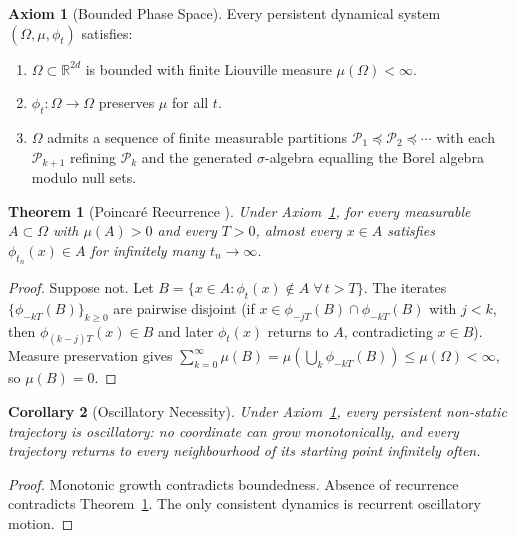 \documentclass[twocolumn,10pt,a4paper]{article}
\theoremstyle{thmstyle}
\newtheorem{theorem}{Theorem}[section]
\newtheorem{corollary}[theorem]{Corollary}
\theoremstyle{definition}
\newtheorem{axiom}{Axiom}
\theoremstyle{remark}
\newcommand{\R}{\mathbb{R}}
\begin{document}
\begin{axiom}[Bounded Phase Space]
\label{ax:bounded}
Every persistent dynamical system $(\Omega, \mu, \phi_t)$ satisfies:
\begin{enumerate}[nosep,label=(\roman*)]
\item $\Omega \subset \R^{2d}$ is bounded with finite Liouville measure
$\mu(\Omega) < \infty$.
\item $\phi_t : \Omega \to \Omega$ preserves $\mu$ for all $t$.
\item $\Omega$ admits a sequence of finite measurable partitions
$\mathcal{P}_1 \preceq \mathcal{P}_2 \preceq \cdots$ with each $\mathcal{P}_{k+1}$
refining $\mathcal{P}_k$ and the generated $\sigma$-algebra equalling the
Borel algebra modulo null sets.
\end{enumerate}
\end{axiom}

\begin{theorem}[Poincar\'e Recurrence \citealp{poincare1890}]
\label{thm:poincare}
Under Axiom~\ref{ax:bounded}, for every measurable $A \subset \Omega$ with
$\mu(A) > 0$ and every $T > 0$, almost every $x \in A$ satisfies
$\phi_{t_n}(x) \in A$ for infinitely many $t_n \to \infty$.
\end{theorem}

\begin{proof}
Suppose not. Let $B = \{x \in A : \phi_t(x) \notin A\;\forall\, t > T\}$.
The iterates $\{\phi_{-kT}(B)\}_{k \geq 0}$ are pairwise disjoint (if
$x \in \phi_{-jT}(B) \cap \phi_{-kT}(B)$ with $j < k$, then
$\phi_{(k-j)T}(x) \in B$ and later $\phi_t(x)$ returns to $A$,
contradicting $x \in B$). Measure preservation gives
$\sum_{k=0}^\infty \mu(B) = \mu(\bigcup_k \phi_{-kT}(B)) \leq \mu(\Omega) < \infty$,
so $\mu(B) = 0$.
\end{proof}

\begin{corollary}[Oscillatory Necessity]
\label{cor:oscillatory}
Under Axiom~\ref{ax:bounded}, every persistent non-static trajectory is
oscillatory: no coordinate can grow monotonically, and every trajectory
returns to every neighbourhood of its starting point infinitely often.
\end{corollary}

\begin{proof}
Monotonic growth contradicts boundedness. Absence of recurrence contradicts
Theorem~\ref{thm:poincare}. The only consistent dynamics is recurrent
oscillatory motion.
\end{proof}
\end{document}
